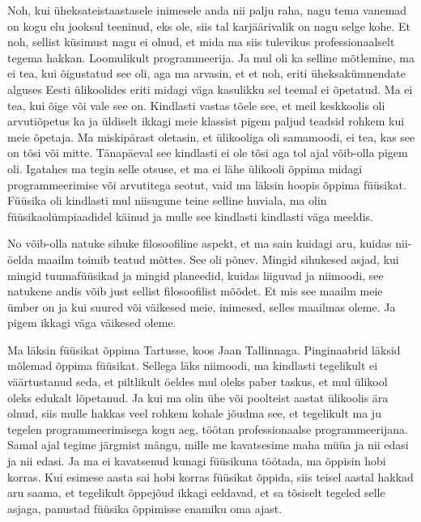 
Noh, kui üheksateistaastasele inimesele anda nii palju raha, nagu tema vanemad 
on kogu elu jooksul teeninud, eks ole, siis tal karjäärivalik on nagu selge 
kohe. Et noh, sellist küsimust nagu ei olnud, et mida ma siis 
tulevikus professionaalselt tegema hakkan. Loomulikult programmeerija.  Ja  mul 
oli ka selline mõtlemine, ma ei tea, kui õigustatud see oli, aga ma arvasin, et 
et noh, eriti üheksakümnendate alguses Eesti ülikoolides eriti midagi väga 
kasulikku sel teemal ei õpetatud. Ma ei tea,  kui õige või vale see on. 
Kindlasti vastas tõele see, et meil keskkoolis oli  arvutiõpetus ka ja üldiselt 
ikkagi meie klassist pigem paljud teadsid rohkem kui meie õpetaja. Ma 
miskipärast oletasin, et ülikooliga oli samamoodi, ei tea, kas see on tõsi või 
mitte. Tänapäeval see kindlasti ei ole tõsi aga  tol ajal  võib-olla pigem oli. 
Igatahes ma tegin selle otsuse, et ma ei lähe ülikooli õppima midagi 
programmeerimise või arvutitega seotut, vaid ma läksin hoopis õppima füüsikat. 
Füüsika oli kindlasti mul  niisugune teine selline huviala,  ma olin 
füüsikaolümpiaadidel käinud  ja mulle see kindlasti kindlasti väga meeldis. 


No võib-olla natuke sihuke filosoofiline aspekt, et ma sain kuidagi aru, kuidas 
nii-öelda maailm toimib teatud mõttes. See oli põnev. Mingid sihukesed asjad, kui 
 mingid tuumafüüsikad ja mingid planeedid, kuidas liiguvad ja niimoodi, see 
natukene andis võib just sellist filosoofilist mõõdet. Et mis see maailm meie 
ümber on ja kui suured või väikesed meie, inimesed, selles maailmas  oleme.  Ja pigem ikkagi väga väikesed oleme. 


Ma läksin  füüsikat õppima Tartusse, koos Jaan 
Tallinnaga. Pinginaabrid läksid mõlemad õppima 
füüsikat. Sellega läks niimoodi, ma kindlasti  tegelikult ei väärtustanud seda, 
et piltlikult öeldes mul oleks paber taskus, et mul ülikool oleks   
edukalt lõpetanud. Ja kui ma olin ühe või poolteist aastat ülikoolis ära 
olnud, siis mulle hakkas veel rohkem kohale jõudma see, et tegelikult ma ju 
tegelen programmeerimisega kogu aeg, töötan professionaalse programmeerijana. 
Samal ajal tegime järgmist mängu, mille me kavatsesime maha müüa ja nii 
edasi ja nii edasi. Ja ma ei kavatsenud kunagi füüsikuna töötada, ma õppisin hobi 
korras. Kui esimese aasta sai hobi korras  füüsikat õppida, 
siis teisel aastal hakkad aru saama, et tegelikult  õppejõud ikkagi eeldavad, 
et sa tõsiselt tegeled selle asjaga, panustad  füüsika õppimisse enamiku oma ajast. 

